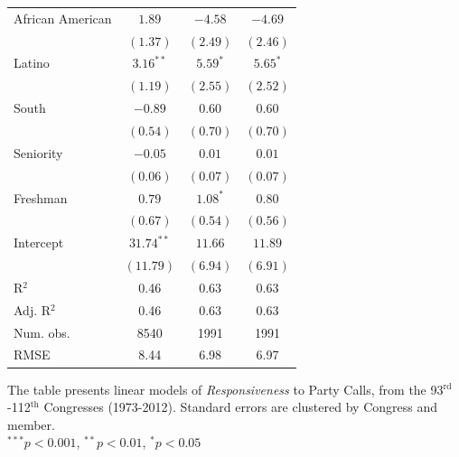 \documentclass[12pt]{article}
\begin{document}
\begin{table}[!htbp]
\begin{threeparttable}
\begin{tabular}{l c c c }
African American      & $1.89$       & $-4.58$      & $-4.69$       \\
                      & $(1.37)$     & $(2.49)$     & $(2.46)$      \\
Latino                & $3.16^{**}$  & $5.59^{*}$   & $5.65^{*}$    \\
                      & $(1.19)$     & $(2.55)$     & $(2.52)$      \\
South                 & $-0.89$      & $0.60$       & $0.60$        \\
                      & $(0.54)$     & $(0.70)$     & $(0.70)$      \\
Seniority             & $-0.05$      & $0.01$       & $0.01$        \\
                      & $(0.06)$     & $(0.07)$     & $(0.07)$      \\
Freshman              & $0.79$       & $1.08^{*}$   & $0.80$        \\
                      & $(0.67)$     & $(0.54)$     & $(0.56)$      \\
Intercept             & $31.74^{**}$ & $11.66$      & $11.89$       \\
                      & $(11.79)$    & $(6.94)$     & $(6.91)$      \\
\hline
R$^2$                 & 0.46         & 0.63         & 0.63          \\
Adj. R$^2$            & 0.46         & 0.63         & 0.63          \\
Num. obs.             & 8540         & 1991         & 1991          \\
RMSE                  & 8.44         & 6.98         & 6.97          \\
\hline

\end{tabular}
\begin{tablenotes}
   \item
   The table presents linear models of \textit{Responsiveness} to Party Calls,
   from the 93$^{\text{rd}}$-112$^{\text{th}}$ Congresses (1973-2012).
  Standard errors are clustered by Congress and member.\\
   $^{***}p<0.001$, $^{**}p<0.01$, $^*p<0.05$
 \end{tablenotes}
\end{threeparttable}
\end{table}
\end{document}

